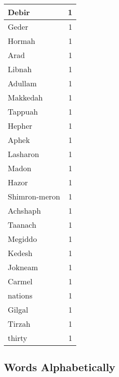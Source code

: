 \begin{center}
\begin{longtable}{l|r}
Debir & 1 \\ \hline
Geder & 1 \\ \hline
Hormah & 1 \\ \hline
Arad & 1 \\ \hline
Libnah & 1 \\ \hline
Adullam & 1 \\ \hline
Makkedah & 1 \\ \hline
Tappuah & 1 \\ \hline
Hepher & 1 \\ \hline
Aphek & 1 \\ \hline
Lasharon & 1 \\ \hline
Madon & 1 \\ \hline
Hazor & 1 \\ \hline
Shimron-meron & 1 \\ \hline
Achshaph & 1 \\ \hline
Taanach & 1 \\ \hline
Megiddo & 1 \\ \hline
Kedesh & 1 \\ \hline
Jokneam & 1 \\ \hline
Carmel & 1 \\ \hline
nations & 1 \\ \hline
Gilgal & 1 \\ \hline
Tirzah & 1 \\ \hline
thirty & 1 \\ \hline
\end{longtable}
\end{center}



\normalsize



\subsection{Words Alphabetically}

